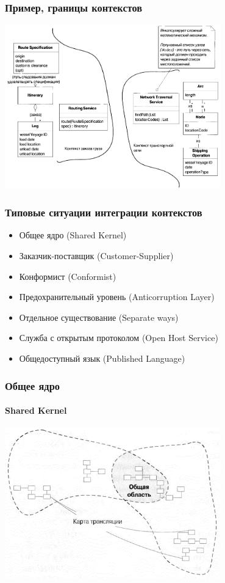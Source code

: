 \documentclass[xetex,mathserif,serif]{beamer}
\begin{document}
	\begin{frame}
		\frametitle{Пример, границы контекстов}
		\begin{center}
			\includegraphics[width=0.7\textwidth]{contextBoundariesExample.png}
		\end{center}
	\end{frame}

	\begin{frame}
		\frametitle{Типовые ситуации интеграции контекстов}
		\begin{itemize}
			\item Общее ядро (Shared Kernel)
			\item Заказчик-поставщик (Customer-Supplier)
			\item Конформист (Conformist)
			\item Предохранительный уровень (Anticorruption Layer)
			\item Отдельное существование (Separate ways)
			\item Служба с открытым протоколом (Open Host Service)
			\item Общедоступный язык (Published Language)
		\end{itemize}
	\end{frame}

	\begin{frame}
		\frametitle{Общее ядро}
		\framesubtitle{Shared Kernel}
		\begin{center}
			\includegraphics[width=0.7\textwidth]{sharedKernel.png}
		\end{center}
	\end{frame}
\end{document}
